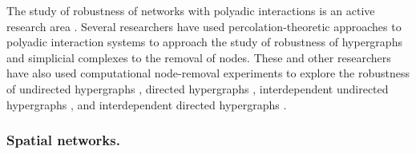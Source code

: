 \documentclass{comnet-mod}
\begin{document}
The study of robustness of networks with polyadic interactions is an active research area \cite{Peng2022, Do2023, Liu2023, Peng2023, Zhao2023, Peng2024, Zhao2024}. Several researchers have used percolation-theoretic approaches to polyadic interaction systems to approach the study of robustness of hypergraphs \cite{Liu2023} and simplicial complexes \cite{Peng2023} to the removal of nodes. These and other researchers have also used computational node-removal experiments to explore the robustness of undirected hypergraphs \cite{Peng2022, Do2023, Peng2024}, directed hypergraphs \cite{Zhao2023}, interdependent undirected hypergraphs \cite{Peng2024} , and interdependent directed hypergraphs \cite{Zhao2024}. 


\subsubsection{Spatial networks.}
\end{document}
